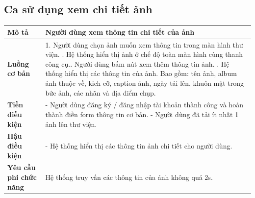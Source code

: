 \subsection{Ca sử dụng xem chi tiết ảnh}

\vspace{0.5cm}

\noindent 
\begin{tabularx}{\linewidth}{| l | X |} 
\hline 
\textbf{Mô tả} & Người dùng xem thông tin chi tiết của ảnh \\
\hline 
\textbf{Luồng cơ bản} & 1. Người dùng chọn ảnh muốn xem thông tin trong màn hình thư viện. \newline
                       2. Hệ thống hiển thị ảnh ở chế độ toàn màn hình cùng thanh công cụ.\newline
                       3. Người dùng bấm nút xem thêm thông tin ảnh. \newline
                       4. Hệ thống hiển thị các thông tin của ảnh. Bao gồm: tên ảnh, album ảnh thuộc về, kich cỡ, caption ảnh, ngày tải lên, khuôn mặt trong bức ảnh, các nhãn và địa điểm chụp. \\
\hline 
\textbf{Tiền điều kiện} & - Người dùng đăng ký / đăng nhập tài khoản thành công và hoàn thành điền form thông tin cơ bản. \newline
                        - Người dùng đã tải ít nhất 1 ảnh lên thư viện. \\
\hline 
\textbf{Hậu điều kiện} & - Hệ thống hiển thị các thông tin ảnh chi tiết cho người dùng. \\
\hline 
\textbf{Yêu cầu phi chức năng} & Hệ thống truy vấn các thông tin của ảnh không quá 2s. \\
\hline 
\end{tabularx}

\vspace{0.8cm}

